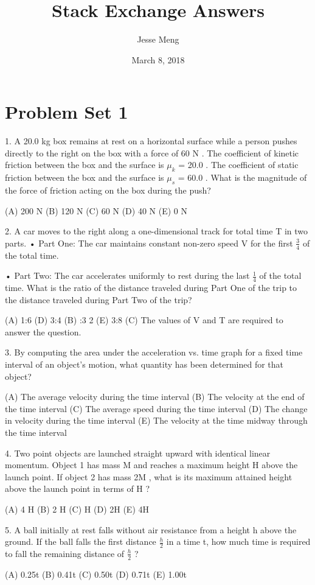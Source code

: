 \documentclass{article}
\title{Stack Exchange Answers}
\author{Jesse Meng }
\date{March 8, 2018}
\begin{document}
\section{Problem Set 1}
1. A 20.0 kg box remains at rest on a horizontal surface while a person pushes directly to the right on the box with a force of 60 N . The coefficient of kinetic friction between the box and the surface is $\mu_k$ = 20.0 . The coefficient of static friction between the box and the surface is $\mu_s$ = 60.0 . What is the magnitude of the force of friction acting on the box during the push? 

(A) 200 N (B) 120 N (C) 60 N (D) 40 N (E) 0 N


2. A car moves to the right along a one-dimensional track for total time T in two parts.
• Part One: The car maintains constant non-zero speed V for the first $\frac{3}{4}$ of the total time.

• Part Two: The car accelerates uniformly to rest during the last $\frac{1}{4}$ of the total time.
What is the ratio of the distance traveled during Part One of the trip to the distance traveled during Part Two of the trip?

(A) 1:6 (D) 3:4
(B) :3 2 (E) 3:8
(C) The values of V and T are required to answer the question.

3. By computing the area under the acceleration vs. time graph for a fixed time interval of an object’s motion, what quantity has been determined for that object? 

(A) The average velocity during the time interval 
(B) The velocity at the end of the time interval 
(C) The average speed during the time interval 
(D) The change in velocity during the time interval 
(E) The velocity at the time midway through the time interval

4. Two point objects are launched straight upward with identical linear momentum. Object 1 has mass M and reaches a maximum height H above the launch point. If object 2 has mass 2M , what is its maximum attained height above the launch point in terms of H ? 

(A) 4 H 
(B) 2 H 
(C) H
(D) 2H 
(E) 4H


5. A ball initially at rest falls without air resistance from a height h above the ground. If the ball falls the first distance $\frac{h}{2}$ in a time t, how much time is required to fall the remaining distance of $\frac{h}{2}$ ? 

(A) 0.25t 
(B) 0.41t 
(C) 0.50t 
(D) 0.71t 
(E) 1.00t
\end{document}

